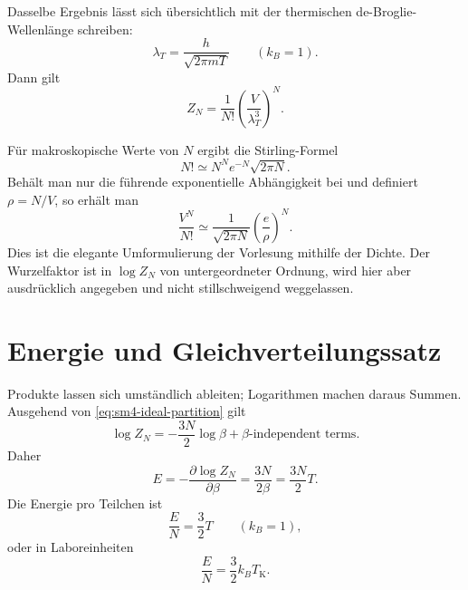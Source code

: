 Dasselbe Ergebnis lässt sich übersichtlich mit der thermischen de-Broglie-Wellenlänge schreiben:
\begin{equation}
 \lambda_T=\frac{h}{\sqrt{2\pi mT}}
 \qquad (k_B=1).
\end{equation}
Dann gilt
\begin{equation}
 Z_N=\frac{1}{N!}\left(\frac{V}{\lambda_T^3}\right)^N.
 \label{eq:sm4-thermal-wavelength-form}
\end{equation}

Für makroskopische Werte von \(N\) ergibt die Stirling-Formel
\begin{equation}
 N!\simeq N^Ne^{-N}\sqrt{2\pi N}.
\end{equation}
Behält man nur die führende exponentielle Abhängigkeit bei und definiert \(\rho=N/V\), so erhält man
\begin{equation}
 \frac{V^N}{N!}
 \simeq
 \frac{1}{\sqrt{2\pi N}}
 \left(\frac{e}{\rho}\right)^N.
 \label{eq:sm4-density-rewrite}
\end{equation}
Dies ist die elegante Umformulierung der Vorlesung mithilfe der Dichte. Der Wurzelfaktor ist in \(\log Z_N\) von untergeordneter Ordnung, wird hier aber ausdrücklich angegeben und nicht stillschweigend weggelassen.

\begin{classroomqa}
\end{classroomqa}

\section{Energie und Gleichverteilungssatz}

Produkte lassen sich umständlich ableiten; Logarithmen machen daraus Summen. Ausgehend von \eqref{eq:sm4-ideal-partition} gilt
\begin{equation}
 \log Z_N
 =-\frac{3N}{2}\log\beta+\text{\(\beta\)-independent terms}.
 \label{eq:sm4-log-ideal-partition}
\end{equation}
Daher
\begin{equation}
 E
 =-\frac{\partial\log Z_N}{\partial\beta}
 =\frac{3N}{2\beta}
 =\frac{3N}{2}T.
 \label{eq:sm4-ideal-energy}
\end{equation}
Die Energie pro Teilchen ist
\begin{equation}
 \frac{E}{N}=\frac{3}{2}T
 \qquad (k_B=1),
\end{equation}
oder in Laboreinheiten
\begin{equation}
 \frac{E}{N}=\frac{3}{2}k_BT_{\mathrm K}.
 \label{eq:sm4-ideal-energy-lab}
\end{equation}

